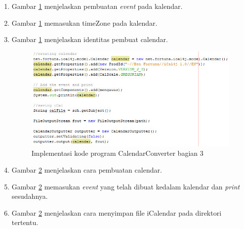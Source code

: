 \begin{enumerate}
\begin{enumerate}
\begin{figure}[H]
		\caption{Implementasi kode program CalendarConverter bagian 2}
		\label{fig:calConverter2}
		\end{figure}
	\item Gambar \ref{fig:calConverter2} menjelaskan pembuatan \textit{event} pada kalendar.
	\item Gambar \ref{fig:calConverter2} memasukan timeZone pada kalendar.
	\item Gambar \ref{fig:calConverter2} menjelaskan identitas pembuat calendar.
	\begin{figure}[H]
		\centering
		\includegraphics[scale=0.7]{Gambar/calConverter3}
		\caption{Implementasi kode program CalendarConverter bagian 3}
		\label{fig:calConverter3}
		\end{figure}
	\item Gambar \ref{fig:calConverter3} menjelaskan cara pembuatan calendar.
	\item Gambar \ref{fig:calConverter3} memasukan \textit{event} yang telah dibuat kedalam kalendar dan \textit{print} sesudahnya.
	\item Gambar \ref{fig:calConverter3} menjelaskan cara menyimpan file iCalendar pada direktori tertentu.
\end{enumerate}


\end{enumerate}

